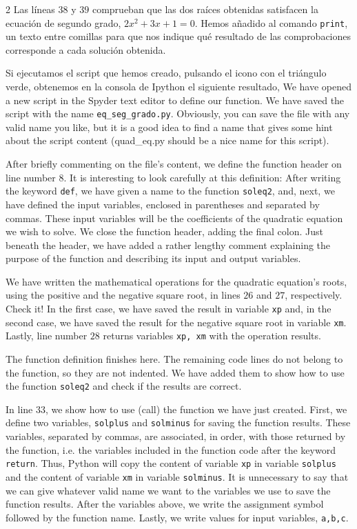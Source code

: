 \begin{paracol}{2}
     Las líneas $38$ y $39$ comprueban que las dos raíces obtenidas satisfacen la ecuación de segundo grado, $2x^2+3x+1 = 0$. Hemos añadido al comando \texttt{print}, un texto entre comillas para que nos indique qué resultado de las comprobaciones corresponde a cada solución obtenida.

     Si ejecutamos el script que hemos creado, pulsando el icono con el triángulo verde, obtenemos en la consola de Ipython el siguiente resultado,
     \switchcolumn
     We have opened a new script in the Spyder text editor to define our function. We have saved the script with the name \texttt{eq\_seg\_grado.py}. Obviously, you can save the file with any valid name you like, but it is a good idea to find a name that gives some hint about the script content (quad\_eq.py should be a nice name for this script). 

     After briefly commenting on the file's content, we define the function header on line number $8$. It is interesting to look carefully at this definition: After writing the keyword \texttt{def}, we have given a name to the function \texttt{soleq2}, and, next, we have defined the input variables, enclosed in parentheses and separated by commas. These input variables will be the coefficients of the quadratic equation we wish to solve. We close the function header, adding the final colon. Just beneath the header, we have added a rather lengthy comment explaining the purpose of the function and describing its input and output variables.

     We have written the mathematical operations for the quadratic equation's roots, using the positive and the negative square root, in lines $26$ and $27$, respectively. Check it! In the first case, we have saved the result in variable \texttt{xp} and, in the second case, we have saved the result for the negative square root in variable \texttt{xm}. Lastly, line number $28$ returns variables \texttt{xp, xm} with the operation results.

     The function definition finishes here. The remaining code lines do not belong to the function, so they are not indented. We have added them to show how to use the function \texttt{soleq2} and check if the results are correct.

     In line $33$, we show how to use (call) the function we have just created. First, we define two variables, \texttt{solplus} and \texttt{solminus} for saving the function results.
     These variables, separated by commas, are associated, in order, with those returned by the function, i.e. the variables included in the function code after the keyword \texttt{return}. Thus, Python will copy the content of variable \texttt{xp} in variable \texttt{solplus} and the content of variable \texttt{xm} in variable \texttt{solminus}. It is unnecessary to say that we can give whatever valid name we want to the variables we use to save the function results. After the variables above, we write the assignment symbol followed by the function name. Lastly, we write values for input variables, \texttt{a,b,c}.


\end{paracol}
